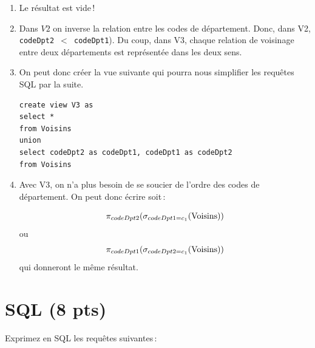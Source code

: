 \begin{solution}

\begin{enumerate} 
  \item Le résultat est vide\,!

  \item Dans $V2$ on inverse la relation entre les codes de département. Donc, dans V2,
     \texttt{codeDpt2  $<$ codeDpt1}). Du coup, dans V3, chaque relation de voisinage
     entre deux départements est représentée dans les deux sens.
  
  \item On peut donc créer la vue suivante qui pourra nous simplifier les requêtes SQL
     par la suite.
     
\begin{verbatim}
create view V3 as
select *
from Voisins 
union
select codeDpt2 as codeDpt1, codeDpt1 as codeDpt2
from Voisins
\end{verbatim}

   \item Avec V3, on n'a plus besoin de se soucier de l'ordre des codes de département.
     On peut donc écrire soit\,:
   
   $$\pi_{codeDpt2} (\sigma_{codeDpt1=c_1} (\rm{Voisins}))$$   
   ou
   $$\pi_{codeDpt1} (\sigma_{codeDpt2=c_1} (\rm{Voisins}))$$
   qui donneront le même résultat.

\end{enumerate}

\end{solution}


\section{SQL (8 pts)}

Exprimez en SQL les requêtes suivantes\,:

